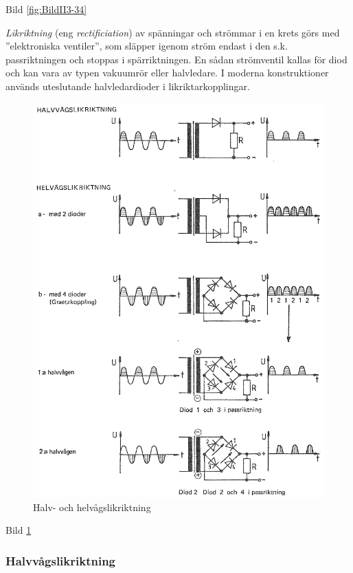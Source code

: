 Bild \ref{fig:BildII3-34}

\emph{Likriktning} (eng \emph{rectificiation}) av spänningar och strömmar i en
krets görs med ''elektroniska ventiler'', som släpper igenom ström endast i den
s.k. passriktningen och stoppas i spärriktningen. En sådan strömventil
kallas för diod och kan vara av typen vakuumrör eller halvledare. I
moderna konstruktioner används uteslutande halvledardioder i
likriktarkopplingar.

\begin{figure}
\includegraphics[width=\textwidth]{images/bild_2_3-35.png}
\caption{Halv- och helvågslikriktning}
\label{fig:BildII3-35}
\end{figure}

Bild \ref{fig:BildII3-35}

\subsubsection{Halvvågslikriktning}

